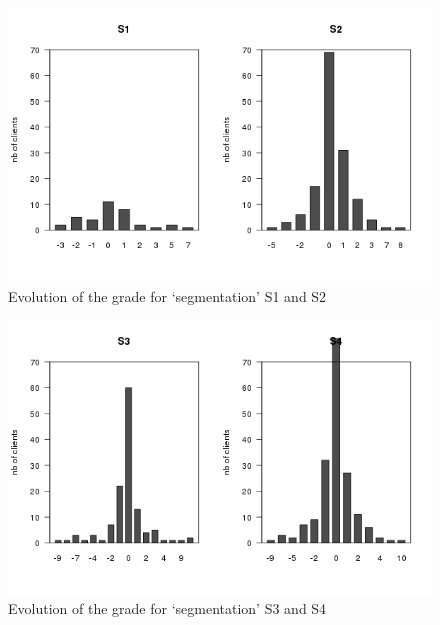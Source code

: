 \documentclass[a4paper, 11pt]{article}
\begin{document}
    \begin{figure}[!ht]
            \centering
            \includegraphics[height = 10 cm]{Remi/Evolution_of_the_grade_for_segmentation_S2.png}
            \caption{Evolution of the grade for `segmentation' S1 and S2}
            \label{fig:e_seg_S2}
    \end{figure}

    \begin{figure}[!ht]
            \centering
            \includegraphics[height = 10 cm]{Remi/Evolution_of_the_grade_for_segmentation_S4.png}
            \caption{Evolution of the grade for `segmentation' S3 and S4}
            \label{fig:e_seg_S4}
    \end{figure}
\end{document}
